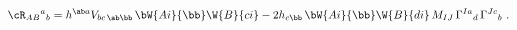 \begin{equation}
  {\cR_{AB}}{}^a{}_b = h^{\ab a} V_{bc\,\ab\bb}\, \bW{Ai}{\bb} \W{B}{ci}
  - 2 h_{c\bb}\, \bW{Ai}{\bb} \W{B}{di}\, M_{IJ}\, \Gamma^{Ia}{}_d\,
  \Gamma^{Jc}{}_b\ .
 \end{equation}

